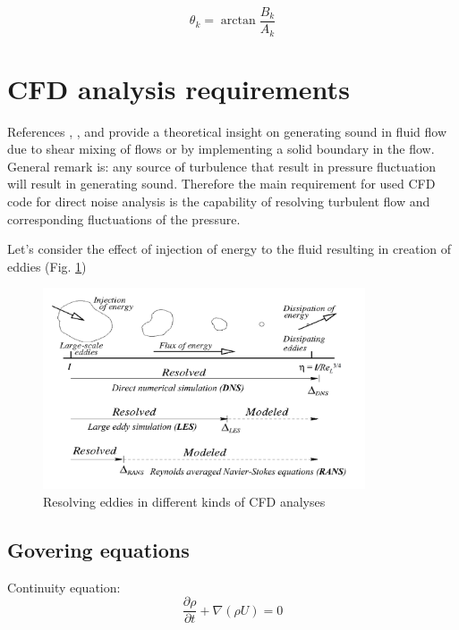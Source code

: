 \begin{equation} \label{eq:dftphase}
\theta_k = \arctan \frac{B_k}{A_k}
\end{equation}


\section{CFD analysis requirements} \label{cfdreq}
References \citep{Light1}, \citep{Light2}, \citep{FWH} and \citep{curle} provide a theoretical insight on generating sound in fluid flow due to shear mixing of flows or by implementing a solid boundary in the flow. General remark is: any source of turbulence that result in pressure fluctuation will result in generating sound. Therefore the main requirement for used CFD code for direct noise analysis is the capability of resolving turbulent flow and corresponding fluctuations of the pressure.

Let's consider the effect of injection of energy to the fluid resulting in creation of eddies (Fig. \ref{CFDTypes})

\begin{figure}[h!]
\centering %
\includegraphics[width=0.85\textwidth]{Pictures/CFD_Types.png}
\caption{Resolving eddies in different kinds of CFD analyses}
\label{CFDTypes}
\end{figure}

\subsection{Govering equations} \label{goveq}

Continuity equation:
\begin{equation} \label{eq:cont}
\frac{\partial \rho}{\partial t} + \nabla (\rho U) = 0
\end{equation}

